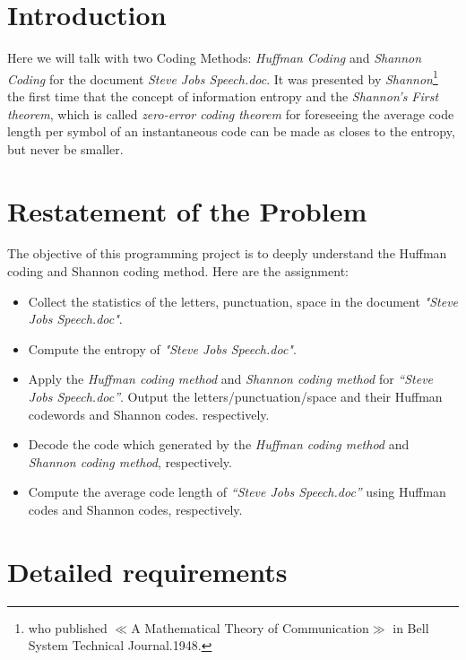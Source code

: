 \documentclass[12pt]{article} %
\numberwithin{equation}{section}
\begin{document}
\section{Introduction} %

Here we will talk with two Coding Methods: \emph{Huffman Coding} and \emph{Shannon Coding} for the document \emph{Steve Jobs Speech.doc}. It was presented by \emph{Shannon}\footnote{who published $\ll$A Mathematical Theory of Communication$\gg$ in Bell System Technical Journal.1948.} the first time that the concept of information entropy and the \emph{Shannon's First theorem}, which is called \emph{zero-error coding theorem} for foreseeing the average code length per symbol of an instantaneous code can be made as closes to the entropy, but never be smaller.


\section{Restatement of the Problem}
The objective of this programming project is to deeply understand the Huffman coding and Shannon coding method. Here are the assignment:
\begin{itemize}
  \item Collect the statistics of the letters, punctuation, space in the document \emph{"Steve Jobs Speech.doc"}.
  \item Compute the entropy of \emph{"Steve Jobs Speech.doc"}.
  \item Apply the \emph{Huffman coding method} and \emph{Shannon coding method} for \emph{“Steve Jobs Speech.doc”}. Output the letters/punctuation/space and their Huffman codewords and Shannon codes.
respectively.
  \item Decode the code which generated by the \emph{Huffman coding method} and \emph{Shannon coding method}, respectively.
  \item Compute the average code length of \emph{“Steve Jobs Speech.doc”} using Huffman codes and Shannon codes, respectively.
\end{itemize}


\section{Detailed requirements}
\end{document}
